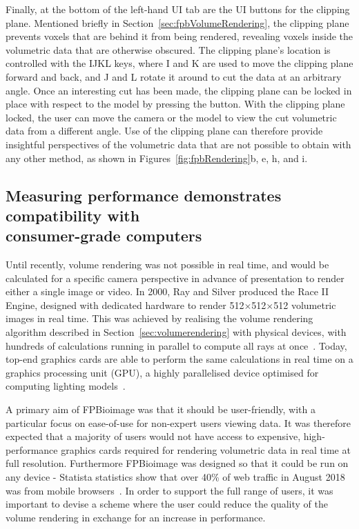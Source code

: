 Finally, at the bottom of the left-hand UI tab are the UI buttons for the clipping plane.
Mentioned briefly in Section~\ref{sec:fpbVolumeRendering}, the clipping plane prevents voxels that are behind it from being rendered, revealing voxels inside the volumetric data that are otherwise obscured.
The clipping plane's location is controlled with the IJKL keys, where I and K are used to move the clipping plane forward and back, and J and L rotate it around to cut the data at an arbitrary angle.
Once an interesting cut has been made, the clipping plane can be locked in place with respect to the model by pressing the  button.
With the clipping plane locked, the user can move the camera or the model to view the cut volumetric data from a different angle.
Use of the clipping plane can therefore provide insightful perspectives of the volumetric data that are not possible to obtain with any other method, as shown in Figures~\ref{fig:fpbRendering}b, e, h, and i.

\subsection[Measuring performance demonstrates compatibility with consumer-grade computers]{Measuring performance demonstrates compatibility with\\ consumer-grade computers} \label{sec:fpbPerformance}
Until recently, volume rendering was not possible in real time, and would be calculated for a specific camera perspective in advance of presentation to render either a single image or video.
In 2000, Ray and Silver produced the Race II Engine, designed with dedicated hardware to render 512$\times$512$\times$512 volumetric images in real time.
This was achieved by realising the volume rendering algorithm described in Section~\ref{sec:volumerendering} with physical devices, with hundreds of calculations running in parallel to compute all rays at once~\cite{ray2000race}.
Today, top-end graphics cards are able to perform the same calculations in real time on a graphics processing unit (GPU), a highly parallelised device optimised for computing lighting models~\cite{lindholm2008nvidia}.

A primary aim of FPBioimage was that it should be user-friendly, with a particular focus on ease-of-use for non-expert users viewing data.
It was therefore expected that a majority of users would not have access to expensive, high-performance graphics cards required for rendering volumetric data in real time at full resolution.
Furthermore FPBioimage was designed so that it could be run on any device - Statista statistics show that over 40\% of web traffic in August 2018 was from mobile browsers~\cite{statistica2018mobile}.
In order to support the full range of users, it was important to devise a scheme where the user could reduce the quality of the volume rendering in exchange for an increase in performance.

